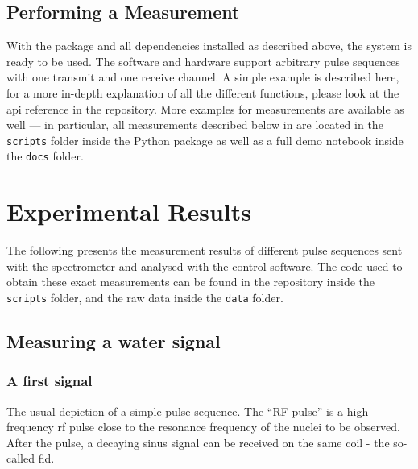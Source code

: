 \section{Performing a Measurement}
With the package and all dependencies installed as described above, the system is ready to be used. The software and hardware support arbitrary pulse sequences with one transmit and one receive channel. A simple example is described here, for a more in-depth explanation of all the different functions, please look at the \acrshort{api} reference in the repository. More examples for measurements are available as well --- in particular, all measurements described below in  are located in the \lstinline{scripts} folder inside the Python package as well as a full demo notebook inside the \lstinline{docs} folder.



\chapter{Experimental Results}
The following presents the measurement results of different pulse sequences sent with the spectrometer and analysed with the control software. The code used to obtain these exact measurements can be found in the repository inside the \lstinline{scripts} folder, and the raw data inside the \lstinline{data} folder.

\section{Measuring a water signal}
\subsection{A first signal}

\begin{marginfigure}
    \centering
    
    \caption{ The usual depiction of a simple pulse sequence. The \enquote{RF pulse} is a high frequency \acrshort{rf} pulse close to the resonance frequency of the nuclei to be observed. After the pulse, a decaying sinus signal can be received on the same coil -  the so-called \acrfull{fid}.}
\end{marginfigure}

